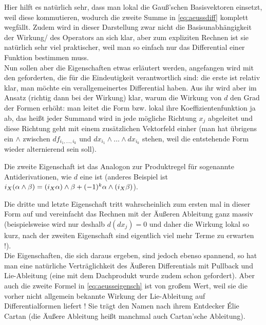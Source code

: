 \documentclass[../H_Analysis_main.tex]{subfiles}
\begin{document}
Hier hilft es natürlich sehr, dass man lokal die Gauß'schen Basisvektoren einsetzt, weil diese kommutieren, wodurch die zweite Summe in \eqref{eq:aeussdiff} komplett wegfällt. Zudem wird in dieser Darstellung zwar nicht die Basisunabhängigkeit der Wirkung/ des Operators an sich klar, aber zum expliziten Rechnen ist sie natürlich sehr viel praktischer, weil man so einfach nur das Differential einer Funktion bestimmen muss.\\


Nun sollen aber die Eigenschaften etwas erläutert werden, angefangen wird mit den geforderten, die für die Eindeutigkeit verantwortlich sind: die erste ist relativ klar, man möchte ein verallgemeinertes Differential haben. Aus ihr wird aber im Ansatz (richtig dann bei der Wirkung) klar, warum die Wirkung von $d$ den Grad der Formen erhöht: man leitet die Form bzw. lokal ihre Koeffizientenfunktion ja ab, das heißt jeder Summand wird in jede mögliche Richtung $x_j$ abgeleitet und diese Richtung geht mit einem zusätzlichen Vektorfeld einher (man hat übrigens ein $\wedge$ zwischen $df_{i_1, \dots, i_k}$ und $dx_{i_1} \wedge \dots \wedge dx_{i_k}$ stehen, weil die entstehende Form wieder alternierend sein soll).

Die zweite Eigenschaft ist das Analogon zur Produktregel für sogenannte Antiderivationen, wie $d$ eine ist (anderes Beispiel ist $i_X \qty(\alpha \wedge \beta) = \qty(i_X \alpha) \wedge \beta + (-1)^k \alpha \wedge \qty(i_X \beta)$).

Die dritte und letzte Eigenschaft tritt wahrscheinlich zum ersten mal in dieser Form auf und vereinfacht das Rechnen mit der Äußeren Ableitung ganz massiv (beispielsweise wird nur deshalb $d(dx_j) = 0$ und daher die Wirkung lokal so kurz, nach der zweiten Eigenschaft sind eigentlich viel mehr Terme zu erwarten !).\\


Die Eigenschaften, die sich daraus ergeben, sind jedoch ebenso spannend, so hat man eine natürliche Verträglichkeit des Äußeren Differentials mit Pullback und Lie-Ableitung (eine mit dem Dachprodukt wurde zudem schon gefordert). Aber auch die zweite Formel in \eqref{eq:aeusseigensch} ist von großem Wert, weil sie die vorher nicht allgemein bekannte Wirkung der Lie-Ableitung auf Differentialformen liefert ! Sie trägt den Namen  nach ihrem Entdecker Élie Cartan (die Äußere Ableitung heißt manchmal auch Cartan'sche Ableitung).
\end{document}
